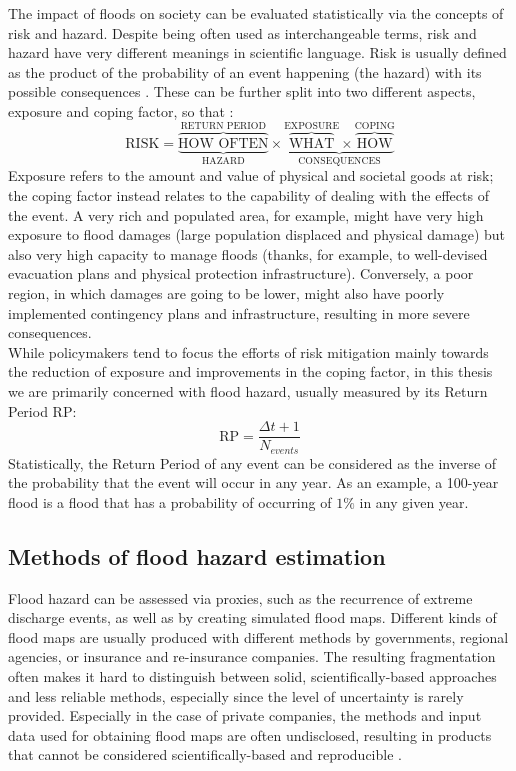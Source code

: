 The impact of floods on society can be evaluated statistically via the concepts of risk and hazard.
Despite being often used as interchangeable terms, risk and hazard have very different meanings in scientific language. Risk is usually defined as the product of the probability of an event happening (the hazard) with its possible consequences \citep[see e.g.][]{Kron2002, DeMoel2009, Merz2007}. These can be further split into two different aspects, exposure and coping factor, so that \citep{IPCC2012RISK}:
$$\text{RISK} = \overbrace{\underbrace{\text{HOW OFTEN}}_\text{HAZARD}}^{\text{RETURN PERIOD}} \times \underbrace{\overbrace{\text{WHAT}}^{\text{EXPOSURE}} \times \overbrace{\text{HOW}}^{\text{COPING}}}_\text{CONSEQUENCES}$$
Exposure refers to the amount and value of physical and societal goods at risk; the coping factor instead relates to the capability of dealing with the effects of the event. A very rich and populated area, for example, might have very high exposure to flood damages (large population displaced and physical damage) but also very high capacity to manage floods (thanks, for example, to well-devised evacuation plans and physical protection infrastructure). Conversely, a poor region, in which damages are going to be lower, might also have poorly implemented contingency plans and infrastructure, resulting in more severe consequences.\\
While policymakers tend to focus the efforts of risk mitigation mainly towards the reduction of exposure and improvements in the coping factor, in this thesis we are primarily concerned with flood hazard, usually measured by its Return Period RP:
$$\text{RP} = \frac{\Delta t + 1}{N_{events}}$$
Statistically, the Return Period of any event can be considered as the inverse of the probability that the event will occur in any year. As an example, a 100-year flood is a flood that has a probability of occurring of $1\%$ in any given year.

\subsection{Methods of flood hazard estimation} \label{subs:flood_hazard_methods}
Flood hazard can be assessed via proxies, such as the recurrence of extreme discharge events, as well as by creating simulated flood maps. Different kinds of flood maps are usually produced with different methods by governments, regional agencies, or insurance and re-insurance companies. The resulting fragmentation often makes it hard to distinguish between solid, scientifically-based approaches and less reliable methods, especially since the level of uncertainty is rarely provided. Especially in the case of private companies, the methods and input data used for obtaining flood maps are often undisclosed, resulting in products that cannot be considered scientifically-based and reproducible \citep{DeMoel2009}.

